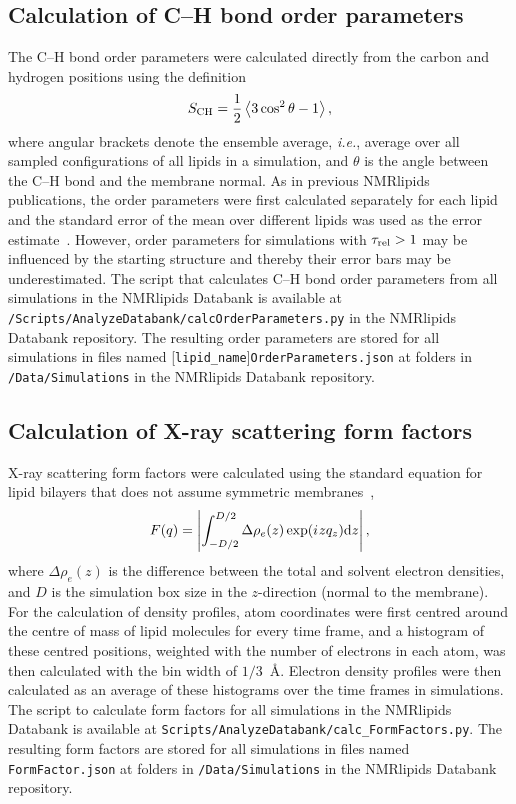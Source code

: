 \documentclass[fleqn,10pt]{wlscirep}
\newcommand{\iu}{{i\mkern1mu}}
\begin{document}
\subsection{Calculation of C--H bond order parameters}
The C--H bond order parameters were calculated directly from the carbon and hydrogen positions using the definition
\begin{equation}\label{OP}
S_{\rm CH}=\frac{1}{2}\left\langle 3\cos^2\theta -1 \right\rangle,
\end{equation}
where angular brackets denote the ensemble average, \textit{i.e.}, average over all sampled configurations of all lipids in a simulation, and $\theta$ is the angle between the C--H bond and the membrane normal. As in previous NMRlipids publications, the order parameters were first calculated separately for each lipid and the standard error of the mean over different lipids was used as the error estimate~\cite{botan15}. However, order parameters for simulations with $\tau_{\rm rel} > 1$ may be influenced by the starting structure and thereby their error bars may be underestimated. The script that calculates C--H bond order parameters from all simulations in the NMRlipids Databank is available at \texttt{/Scripts/AnalyzeDatabank/calcOrderParameters.py} in the NMRlipids Databank repository. The resulting order parameters are stored for all simulations in files named %
[\texttt{lipid\_name}]\texttt{OrderParameters.json} at folders in \texttt{/Data/Simulations} in the NMRlipids Databank repository.

\subsection{Calculation of X-ray scattering form factors}
X-ray scattering form factors were calculated using the standard equation for lipid bilayers that does not assume symmetric membranes~\cite{ollila16},
\begin{equation}\label{FFsimpl}
F(q)= \left\lvert\int_{-D/2}^{D/2}\Delta \rho_e(z) \exp(\iu zq_z) {\rm d}z \right\rvert,
\end{equation}
where $\Delta \rho_e(z)$ is the difference between the total and solvent electron densities, and $D$ is the simulation box size in the $z$-direction (normal to the membrane). For the calculation of density profiles, atom coordinates were first centred around the centre of mass of lipid molecules for every time frame, and a histogram of these centred positions, weighted with the number of electrons in each atom, was then calculated with the bin width of $1/3$~\AA{}. Electron density profiles were then calculated as an average of these histograms over the time frames in simulations. The script to calculate form factors for all simulations in the NMRlipids Databank is available at \texttt{Scripts/AnalyzeDatabank/calc\_FormFactors.py}. The resulting form factors are stored for all simulations in files named \texttt{FormFactor.json} at folders in \texttt{/Data/Simulations} in the NMRlipids Databank repository.
\end{document}
